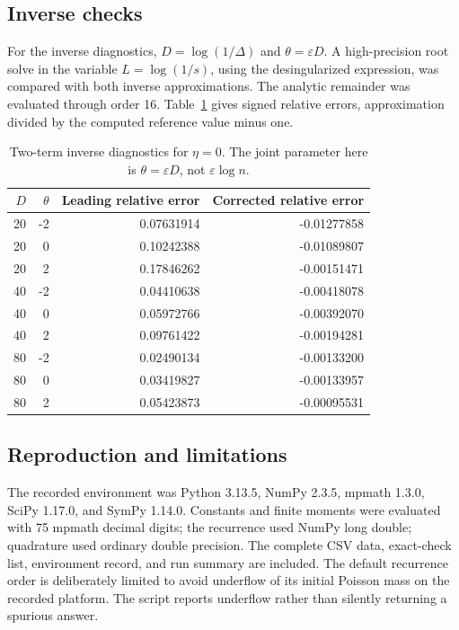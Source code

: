 \documentclass[11pt,a4paper]{article}
\numberwithin{equation}{section}
\theoremstyle{definition}
\theoremstyle{remark}
\newcommand{\eps}{\varepsilon}
\begin{document}
\subsection{Inverse checks}
For the inverse diagnostics, \(D=\log(1/\Delta)\) and
\(\theta=\eps D\). A high-precision root solve in the variable
\(L=\log(1/s)\), using the desingularized expression, was compared with
both inverse approximations. The analytic remainder was evaluated through
order 16. Table~\ref{tab:inverse} gives signed relative errors, approximation
divided by the computed reference value minus one.

\begin{table}[htbp]
\centering\small
\begin{tabular}{rrrr}
\toprule
$D$ & $\theta$ & Leading relative error & Corrected relative error\\
\midrule
20 & -2 & 0.07631914 & -0.01277858\\
20 & 0 & 0.10242388 & -0.01089807\\
20 & 2 & 0.17846262 & -0.00151471\\
40 & -2 & 0.04410638 & -0.00418078\\
40 & 0 & 0.05972766 & -0.00392070\\
40 & 2 & 0.09761422 & -0.00194281\\
80 & -2 & 0.02490134 & -0.00133200\\
80 & 0 & 0.03419827 & -0.00133957\\
80 & 2 & 0.05423873 & -0.00095531\\
\bottomrule
\end{tabular}
\caption{Two-term inverse diagnostics for $\eta=0$. The joint parameter here
is $\theta=\varepsilon D$, not $\varepsilon\log n$.}
\label{tab:inverse}
\end{table}

\subsection{Reproduction and limitations}
The recorded environment was Python 3.13.5, NumPy 2.3.5, mpmath 1.3.0,
SciPy 1.17.0, and SymPy 1.14.0. Constants and finite moments were evaluated
with 75 mpmath decimal digits; the recurrence used NumPy long double;
quadrature used ordinary double precision. The complete CSV data, exact-check
list, environment record, and run summary are included. The default
recurrence order is deliberately limited to avoid underflow of its initial
Poisson mass on the recorded platform. The script reports underflow rather
than silently returning a spurious answer.
\end{document}
